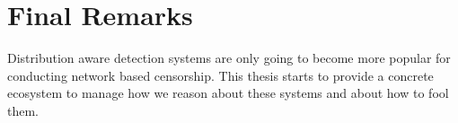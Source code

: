 \documentclass[ %
                    author={Samuel Russell},
                supervisor={Prof. Bogdan Warinschi},
                    degree={MEng},
                     title={Innocuous Ciphertexts},
                  subtitle={The DE-CENSOR Scheme},
                      type={research},
                      year={2018} ]{dissertation}
\begin{document}
\section{Final Remarks}

Distribution aware detection systems are only going to become more popular for conducting network based censorship. This thesis starts to provide a concrete ecosystem to manage how we reason about these systems and about how to fool them.



%
%

\backmatter


\end{document}
